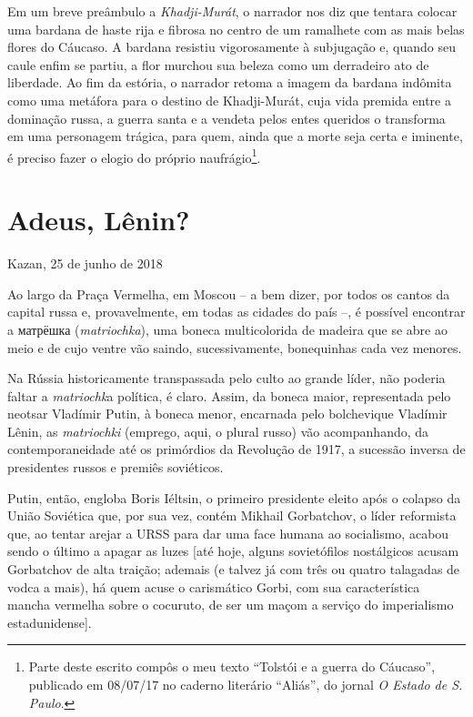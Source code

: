 Em um breve preâmbulo a \emph{Khadji-Murát}, o narrador nos diz que
tentara colocar uma bardana de haste rija e fibrosa no centro de um
ramalhete com as mais belas flores do Cáucaso. A bardana resistiu
vigorosamente à subjugação e, quando seu caule enfim se partiu, a flor
murchou sua beleza como um derradeiro ato de liberdade. Ao fim da
estória, o narrador retoma a imagem da bardana indômita como uma
metáfora para o destino de Khadji-Murát, cuja vida premida entre a
dominação russa, a guerra santa e a vendeta pelos entes queridos o
transforma em uma personagem trágica, para quem, ainda que a morte seja
certa e iminente, é preciso fazer o elogio do próprio
naufrágio\footnote{Parte deste escrito compôs o meu texto ``Tolstói e a
  guerra do Cáucaso'', publicado em 08/07/17 no caderno literário
  ``Aliás'', do jornal \emph{O Estado de S. Paulo}.}.

\chapter*{Adeus, Lênin?}

\begin{flushright}
Kazan, 25 de junho de 2018
\end{flushright}

Ao largo da Praça Vermelha, em Moscou -- a bem dizer, por todos os
cantos da capital russa e, provavelmente, em todas as cidades do país
--, é possível encontrar a матрёшка (\emph{matriochka}), uma boneca
multicolorida de madeira que se abre ao meio e de cujo ventre vão
saindo, sucessivamente, bonequinhas cada vez menores.

Na Rússia historicamente transpassada pelo culto ao grande líder, não
poderia faltar a \emph{matriochk}a política, é claro. Assim, da boneca
maior, representada pelo neotsar Vladímir Putin, à boneca menor,
encarnada pelo bolchevique Vladímir Lênin, as \emph{matriochki}
(emprego, aqui, o plural russo) vão acompanhando, da contemporaneidade
até os primórdios da Revolução de 1917, a sucessão inversa de
presidentes russos e premiês soviéticos.

Putin, então, engloba Boris Iéltsin, o primeiro presidente eleito após o
colapso da União Soviética que, por sua vez, contém Mikhail Gorbatchov,
o líder reformista que, ao tentar arejar a URSS para dar uma face humana
ao socialismo, acabou sendo o último a apagar as luzes {[}até hoje,
alguns sovietófilos nostálgicos acusam Gorbatchov de alta traição;
ademais (e talvez já com três ou quatro talagadas de vodca a mais), há
quem acuse o carismático Gorbi, com sua característica mancha vermelha
sobre o cocuruto, de ser um maçom a serviço do imperialismo
estadunidense{]}.

